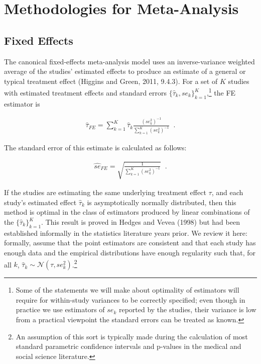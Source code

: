 \documentclass[12pt]{article}
\begin{document}
\section{Methodologies for Meta-Analysis}

\subsection{Fixed Effects}

The canonical fixed-effects meta-analysis model uses an inverse-variance weighted average of the studies' estimated effects to produce an estimate of a general or typical treatment effect (Higgins and Green, 2011, 9.4.3). For a set of $K$ studies with estimated treatment effects and standard errors  $\{\hat{\tau}_k, se_k\}_{k=1}^K$,\footnote{Some of the statements we will make about optimality of estimators will require for within-study variances to be correctly specified; even though in practice we use estimators of $se_k$ reported by the studies, their variance is low from a practical viewpoint the standard errors can be treated as known.} the FE estimator is

\begin{equation}
\label{fe_tau}
\begin{aligned}
\hat{\tau}_{FE} = \sum_{k=1}^K \hat{\tau}_k \frac{  (se^2_k)^{-1}   }{  \sum_{k=1}^K  (se^2_k)^{-1}  } \; \; .
\end{aligned}
\end{equation}

The standard error of this estimate is calculated as follows:

\begin{equation}
\label{fe_se}
\begin{aligned}
\hat{se}_{FE} = \sqrt{ \frac{ 1  }{  \sum_{k=1}^K  (se^2_k)^{-1}  }} \; \; .
\end{aligned}
\end{equation}

If the studies are estimating the same underlying treatment effect $\tau$, and each study's estimated effect $\hat{\tau}_k$ is asymptotically  normally distributed, then this method is optimal in the class of estimators produced by linear combinations of the $\{\hat{\tau}_k\}_{k=1}^K$. This result is proved in Hedges and Vevea (1998) but had been established informally in the statistics literature years prior. We review it here: formally, assume that the point estimators are consistent and that each study has enough data and the empirical distributions have enough regularity such that, for all $k$, $\hat{\tau}_k \sim \mathcal{N}(\tau, se^2_{k})$.\footnote{An assumption of this sort is typically made during the calculation of most standard parametric confidence intervals and p-values in the medical and social science literature.}
\end{document}
